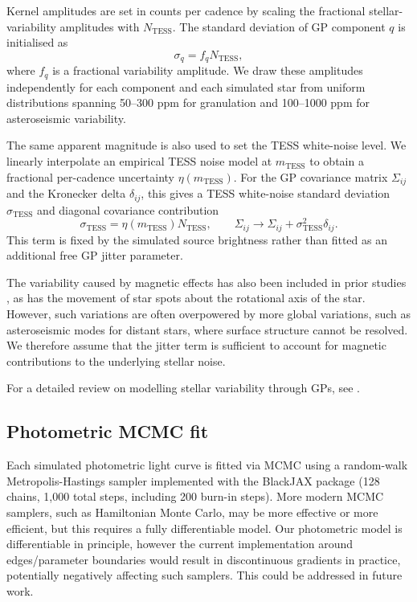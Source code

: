 \documentclass[fleqn,usenatbib]{mnras}
\begin{document}
Kernel amplitudes are set in counts per cadence by scaling the fractional stellar-variability amplitudes with $N_\mathrm{TESS}$. The standard deviation of GP component $q$ is initialised as
\begin{equation}
    \sigma_q = f_q N_\mathrm{TESS},
\end{equation}
where $f_q$ is a fractional variability amplitude. We draw these amplitudes independently for each component and each simulated star from uniform distributions spanning 50--300 ppm for granulation and 100--1000 ppm for asteroseismic variability.

The same apparent magnitude is also used to set the TESS white-noise level. We linearly interpolate an empirical TESS noise model at $m_\mathrm{TESS}$ to obtain a fractional per-cadence uncertainty $\eta(m_\mathrm{TESS})$. For the GP covariance matrix $\Sigma_{ij}$ and the Kronecker delta $\delta_{ij}$, this gives a TESS white-noise standard deviation $\sigma_\mathrm{TESS}$ and diagonal covariance contribution
\begin{equation}
    \sigma_\mathrm{TESS} = \eta(m_\mathrm{TESS})N_\mathrm{TESS},
    \qquad
    \Sigma_{ij} \rightarrow \Sigma_{ij} + \sigma_\mathrm{TESS}^2 \delta_{ij}.
\end{equation}
This term is fixed by the simulated source brightness rather than fitted as an additional free GP jitter parameter.

The variability caused by magnetic effects has also been included in prior studies \citep{haywood_planets_2014,luger_starry_process_2021,foreman-mackey_exoplanet_2021}, as has the movement of star spots about the rotational axis of the star. However, such variations are often overpowered by more global variations, such as asteroseismic modes for distant stars, where surface structure cannot be resolved. We therefore assume that the jitter term is sufficient to account for magnetic contributions to the underlying stellar noise.

For a detailed review on modelling stellar variability through GPs, see \cite{aigrain_gaussian_2023}.

\subsection{Photometric MCMC fit} \label{sec:phot-fit}

Each simulated photometric light curve is fitted via MCMC using a random-walk Metropolis-Hastings sampler implemented with the BlackJAX package (128 chains, 1,000 total steps, including 200 burn-in steps). More modern MCMC samplers, such as Hamiltonian Monte Carlo, may be more effective or more efficient, but this requires a fully differentiable model. Our photometric model is differentiable in principle, however the current implementation around edges/parameter boundaries would result in discontinuous gradients in practice, potentially negatively affecting such samplers. This could be addressed in future work.
\end{document}
